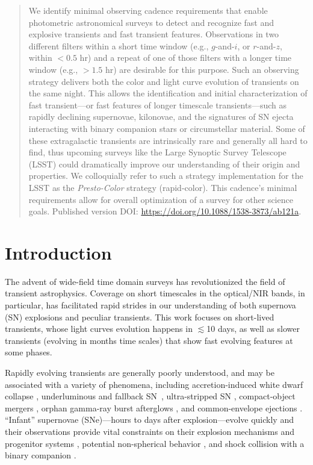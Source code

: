 \documentclass[letterpaper,longauthor,trackchanges,twocolumn,onecolappendix,sort&compress]{aastex62}
\begin{document}
 \begin{abstract}
 
We identify minimal observing cadence requirements that enable photometric astronomical surveys to detect and recognize fast and explosive transients and fast transient features. Observations in two different filters within a short time window (e.g., $g$-and-$i$, or $r$-and-$z$, within $<0.5$ hr) and a repeat of one of those filters with a longer time window (e.g., $>1.5$ hr) are desirable for this purpose. Such an observing strategy delivers both the color and light curve evolution of transients on the same night.     This allows the identification and initial characterization of fast transient---or fast features of longer timescale transients---such as rapidly declining supernovae, kilonovae, and the signatures of SN ejecta interacting with binary companion stars or circumstellar material. Some of these extragalactic transients are intrinsically rare and generally all hard to find, thus upcoming surveys like the Large Synoptic Survey Telescope (LSST) could dramatically improve our understanding of their origin and properties. We colloquially refer to such a strategy implementation for the LSST as the {\em Presto-Color} strategy (rapid-color). This cadence's minimal requirements allow for overall optimization of a survey for other science goals. Published version DOI: \url{https://doi.org/10.1088/1538-3873/ab121a}.
\end{abstract}


%
\section{Introduction}\label{sec:intro}

The advent of wide-field time domain surveys has revolutionized the field of transient astrophysics. Coverage on short timescales in the optical/NIR bands, in particular, has facilitated rapid strides in our understanding of both supernova (SN) explosions and peculiar transients. This work focuses on short-lived transients, whose light curves evolution happens in $\lesssim$10 days, as well as slower transients (evolving in months time scales) that show fast evolving features at some phases.

Rapidly evolving transients are generally poorly understood, and may be associated with a variety of phenomena, including accretion-induced white dwarf collapse \citep{Metzger2009}, underluminous and fallback SN~\citep{Moriya2010}, ultra-stripped SN \citep{Drout2013,Kasliwal2010,Tauris2015,De2018}, compact-object mergers \citep{Kasen2015,Metzger2010}, orphan gamma-ray burst afterglows \citep{Totani2002}, and common-envelope ejections \citep{Blagorodnova2017}. ``Infant'' supernovae (SNe)---hours to days after explosion---evolve quickly and their observations provide vital constraints on their explosion mechanisms and progenitor systems \citep{Nakar2010,Rabinak2011,Nugent2011}, potential non-spherical behavior \citep{Matzner2013,Salbi2014}, and shock collision with a binary companion \citep{Kasen2010}. 
\end{document}
